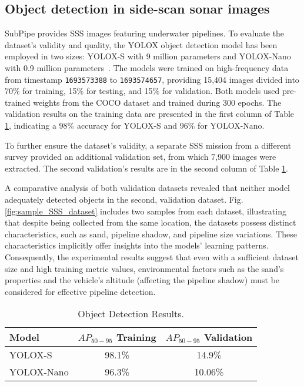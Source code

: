 \subsection{Object detection in side-scan sonar images}
SubPipe provides SSS images featuring underwater pipelines. To evaluate the dataset's validity and quality, the YOLOX object detection model has been employed in two sizes: YOLOX-S with 9 million parameters and YOLOX-Nano with 0.9 million parameters~\cite{yoloxpaper}. The models were trained on high-frequency data from timestamp \texttt{1693573388} to \texttt{1693574657}, providing 15,404 images divided into 70\% for training, 15\% for testing, and 15\% for validation. Both models used pre-trained weights from the COCO dataset and trained during 300 epochs. The validation results on the training data are presented in the first column of Table \ref{table:object_detection}, indicating a 98\% accuracy for YOLOX-S and 96\% for YOLOX-Nano.

To further ensure the dataset's validity, a separate SSS mission from a different survey provided an additional validation set, from which 7,900 images were extracted. The second validation's results are in the second column of Table \ref{table:object_detection}.

A comparative analysis of both validation datasets revealed that neither model adequately detected objects in the second, validation dataset. Fig. \ref{fig:sample_SSS_dataset} includes two samples from each dataset, illustrating that despite being collected from the same location, the datasets possess distinct characteristics, such as sand, pipeline shadow, and pipeline size variations. These characteristics implicitly offer insights into the models' learning patterns. Consequently, the experimental results suggest that even with a sufficient dataset size and high training metric values, environmental factors such as the sand's properties and the vehicle's altitude (affecting the pipeline shadow) must be considered for effective pipeline detection.

\begin{table}[!htbp]
\caption{Object Detection Results.}
\centering
\footnotesize
\label{table:object_detection}
\begin{tabular}{l c c}
\toprule
Model                                      & $\textit{AP}_{50-95}$ Training      & $\textit{AP}_{50-95}$ Validation\\    
\midrule
YOLOX-S            & 98.1\%    & 14.9\% \\
YOLOX-Nano  & 96.3\%    & 10.06\% \\
\bottomrule

\end{tabular}
\end{table}


